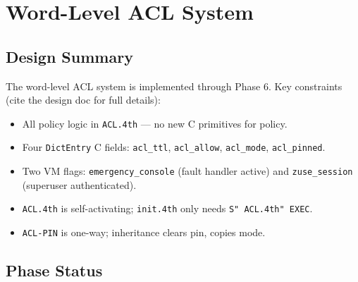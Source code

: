 
\chapter{Word-Level ACL System}
\label{vol1:app:acl}


\section{Design Summary}
\label{vol1:sec:acl:design}


The word-level ACL system is implemented through Phase 6. Key constraints
(cite the design doc for full details):

\begin{itemize}
  \item All policy logic in \texttt{ACL.4th} — no new C primitives for policy.
  \item Four \texttt{DictEntry} C fields: \texttt{acl\_ttl}, \texttt{acl\_allow},
        \texttt{acl\_mode}, \texttt{acl\_pinned}.
  \item Two VM flags: \texttt{emergency\_console} (fault handler active) and
        \texttt{zuse\_session} (superuser authenticated).
  \item \texttt{ACL.4th} is self-activating; \texttt{init.4th} only needs
        \texttt{S" ACL.4th" EXEC}.
  \item \texttt{ACL-PIN} is one-way; inheritance clears pin, copies mode.
\end{itemize}

\section{Phase Status}
\label{vol1:sec:acl:phases}

